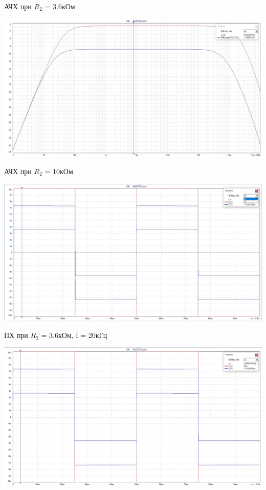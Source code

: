 \documentclass[a4paper,14pt]{extarticle}
\begin{document}
    АЧХ при $R_2$ = 3.6кОм

    \begin{center}
        \includegraphics[scale=0.3]{5.6.jpg}
    \end{center}

    АЧХ при $R_2$ = 10кОм

    \begin{center}
        \includegraphics[scale=0.3]{5.1.jpg}
    \end{center}

    ПХ при $R_2$ = 3.6кОм, f = 20кГц

    \begin{center}
        \includegraphics[scale=0.3]{5.2.jpg}
    \end{center}
\end{document}
